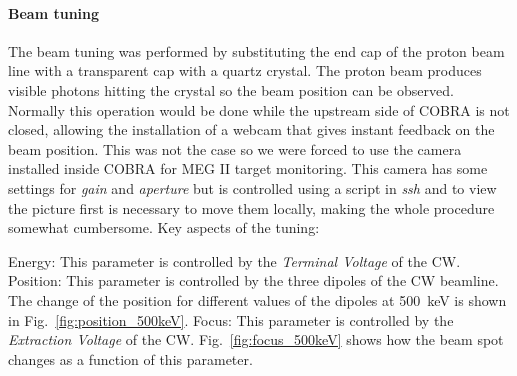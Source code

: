 \begin{refsection}
        \paragraph{Beam tuning}
        The beam tuning was performed by substituting the end cap of the proton beam line with a transparent cap with a quartz crystal. 
        The proton beam produces visible photons hitting the crystal so the beam position can be observed.
        Normally this operation would be done while the upstream side of COBRA is not closed, allowing the installation of a webcam that gives instant feedback on the beam position.
        This was not the case so we were forced to use the camera installed inside COBRA for MEG II target monitoring.
        This camera has some settings for \textit{gain} and \textit{aperture} but is controlled using a script in \textit{ssh} and to view the picture first is necessary to move them locally, making the whole procedure somewhat cumbersome.
        Key aspects of the tuning:
        \begin{outline}
            \1 Energy: This parameter is controlled by the \textit{Terminal Voltage} of the CW. 
            \1 Position: This parameter is controlled by the three dipoles of the CW beamline. The change of the position for different values of the dipoles at \SI{500}{keV} is shown in Fig.~\ref{fig:position_500keV}.
            \1 Focus: This parameter is controlled by the \textit{Extraction Voltage} of the CW. Fig.~\ref{fig:focus_500keV} shows how the beam spot changes as a function of this parameter.
        \end{outline}


\end{refsection}
